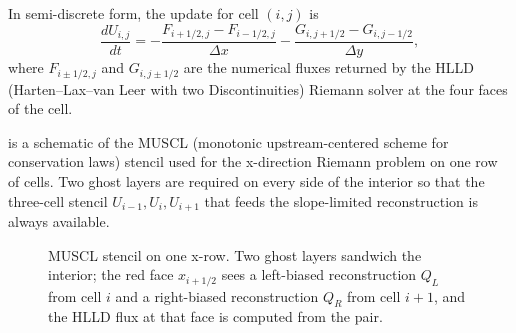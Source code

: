 \documentclass[11pt]{article}
\begin{document}
In semi-discrete form, the update for cell $(i,j)$ is
\begin{equation}
\frac{dU_{i,j}}{dt}
  = -\frac{F_{i+1/2,j} - F_{i-1/2,j}}{\Delta x}
    -\frac{G_{i,j+1/2} - G_{i,j-1/2}}{\Delta y},
\label{eq:semi-discrete}
\end{equation}
where $F_{i\pm 1/2,j}$ and $G_{i,j\pm 1/2}$ are the numerical fluxes returned by the HLLD (Harten--Lax--van Leer with two Discontinuities) Riemann solver at the four faces of the cell.

 is a schematic of the MUSCL (monotonic upstream-centered scheme for conservation laws) stencil used for the x-direction Riemann problem on one row of cells.  Two ghost layers are required on every side of the interior so that the three-cell stencil $U_{i-1},U_i,U_{i+1}$ that feeds the slope-limited reconstruction is always available.

\begin{figure}[H]
\centering
{}
\caption{MUSCL stencil on one x-row.  Two ghost layers sandwich the interior; the red face $x_{i+1/2}$ sees a left-biased reconstruction $Q_{L}$ from cell $i$ and a right-biased reconstruction $Q_{R}$ from cell $i+1$, and the HLLD flux at that face is computed from the pair.}
\label{fig:stencil}
\end{figure}
\end{document}
